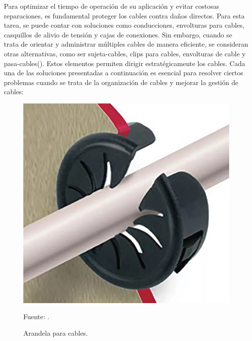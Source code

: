 \begin{enumerate}[label=\alph*)]
\begin{enumerate}[label=\Roman*)]
    Para optimizar el tiempo de operación de su aplicación y evitar costosas reparaciones, es fundamental proteger los cables contra daños directos. Para esta tarea, se puede contar con soluciones como conducciones, envolturas para cables, casquillos de alivio de tensión y cajas de conexiones. Sin embargo, cuando se trata de orientar y administrar múltiples cables de manera eficiente, se consideran otras alternativas, como ser sujeta-cables, clips para cables, envolturas de cable y pasa-cables(\cite{essentraCableManagement}). Estos elementos permiten dirigir estratégicamente los cables.
    Cada una de las soluciones presentadas a continuación es esencial para resolver ciertos problemas cuando se trata de la organización de cables y mejorar la gestión de cables:

    \begin{figure}[H]
    \centering
    \begin{adjustbox}{width=\linewidth/2}
      \includegraphics{media/cable_bushings_esentra.png}
    \end{adjustbox}
    \caption{\label{fig:cable_bushings}Arandela para cables.}
    Fuente: \textcite{essentraCableManagement}.
    \end{figure}
    

\end{enumerate}
\end{enumerate}
